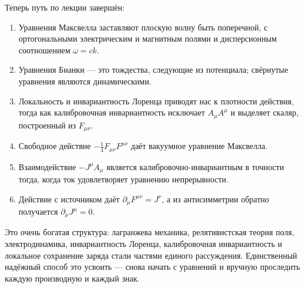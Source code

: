 Теперь путь по лекции завершён:
\begin{enumerate}
\item Уравнения Максвелла заставляют плоскую волну быть поперечной, с ортогональными электрическим и магнитным полями и дисперсионным соотношением \(\omega=ck\).
\item Уравнения Бианки — это тождества, следующие из потенциала; свёрнутые уравнения являются динамическими.
\item Локальность и инвариантность Лоренца приводят нас к плотности действия, тогда как калибровочная инвариантность исключает \(A_\mu A^\mu\) и выделяет скаляр, построенный из \(F_{\mu\nu}\).
\item Свободное действие \(-\tfrac14F_{\mu\nu}F^{\mu\nu}\) даёт вакуумное уравнение Максвелла.
\item Взаимодействие \(-J^\mu A_\mu\) является калибровочно-инвариантным в точности тогда, когда ток удовлетворяет уравнению непрерывности.
\item Действие с источником даёт \(\partial_\mu F^{\mu\nu}=J^\nu\), а из антисимметрии обратно получается \(\partial_\mu J^\mu=0\).
\end{enumerate}

Это очень богатая структура: лагранжева механика, релятивистская теория поля, электродинамика, инвариантность Лоренца, калибровочная инвариантность и локальное сохранение заряда стали частями единого рассуждения. Единственный надёжный способ это усвоить — снова начать с уравнений и вручную проследить каждую производную и каждый знак.

